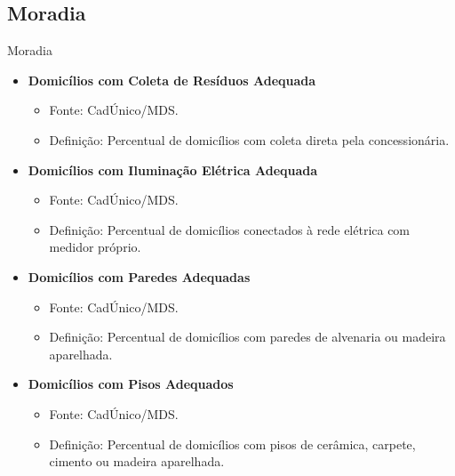\documentclass{beamer}
\begin{document}
\subsection{Moradia}
\begin{frame}{Moradia}
\begin{itemize}
    \item \textbf{Domicílios com Coleta de Resíduos Adequada}
    \begin{itemize}
        \item Fonte: CadÚnico/MDS.
        \item Definição: Percentual de domicílios com coleta direta pela concessionária.
    \end{itemize}
    \item \textbf{Domicílios com Iluminação Elétrica Adequada}
    \begin{itemize}
        \item Fonte: CadÚnico/MDS.
        \item Definição: Percentual de domicílios conectados à rede elétrica com medidor próprio.
    \end{itemize}
    \item \textbf{Domicílios com Paredes Adequadas}
    \begin{itemize}
        \item Fonte: CadÚnico/MDS.
        \item Definição: Percentual de domicílios com paredes de alvenaria ou madeira aparelhada.
    \end{itemize}
    \item \textbf{Domicílios com Pisos Adequados}
    \begin{itemize}
        \item Fonte: CadÚnico/MDS.
        \item Definição: Percentual de domicílios com pisos de cerâmica, carpete, cimento ou madeira aparelhada.
    \end{itemize}
\end{itemize}
\end{frame}
\end{document}

